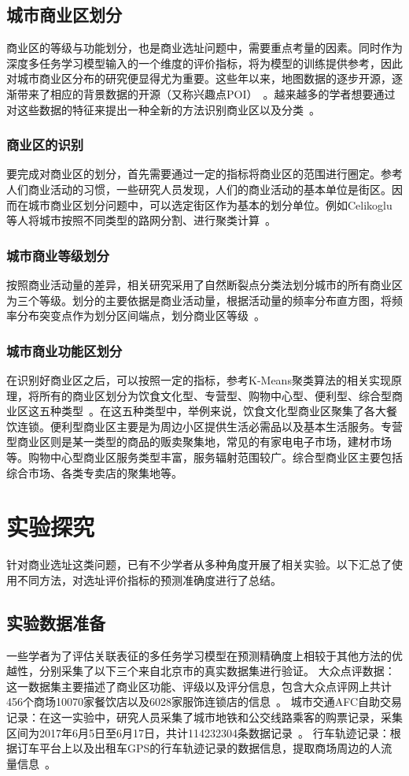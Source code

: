 \documentclass{llncs}
\begin{document}
\subsection{城市商业区划分}
商业区的等级与功能划分，也是商业选址问题中，需要重点考量的因素。同时作为深度多任务学习模型输入的一个维度的评价指标，将为模型的训练提供参考，因此对城市商业区分布的研究便显得尤为重要。这些年以来，地图数据的逐步开源，逐渐带来了相应的背景数据的开源（又称兴趣点POI）~\cite{feng2015personalized,yin2016adapting}。越来越多的学者想要通过对这些数据的特征来提出一种全新的方法识别商业区以及分类~\cite{wang2015shangyefenji}。
\subsubsection{商业区的识别}
要完成对商业区的划分，首先需要通过一定的指标将商业区的范围进行圈定。参考人们商业活动的习惯，一些研究人员发现，人们的商业活动的基本单位是街区。因而在城市商业区划分问题中，可以选定街区作为基本的划分单位。例如Celikoglu等人将城市按照不同类型的路网分割、进行聚类计算~\cite{celikoglu2016extension}。
\subsubsection{城市商业等级划分}
按照商业活动量的差异，相关研究采用了自然断裂点分类法划分城市的所有商业区为三个等级。划分的主要依据是商业活动量，根据活动量的频率分布直方图，将频率分布突变点作为划分区间端点，划分商业区等级~\cite{li2018ziranduanlie}。
\subsubsection{城市商业功能区划分}
在识别好商业区之后，可以按照一定的指标，参考K-Means聚类算法的相关实现原理，将所有的商业区划分为饮食文化型、专营型、购物中心型、便利型、综合型商业区这五种类型~\cite{frandsen2015automatic}。在这五种类型中，举例来说，饮食文化型商业区聚集了各大餐饮连锁。便利型商业区主要是为周边小区提供生活必需品以及基本生活服务。专营型商业区则是某一类型的商品的贩卖聚集地，常见的有家电电子市场，建材市场等。购物中心型商业区服务类型丰富，服务辐射范围较广。综合型商业区主要包括综合市场、各类专卖店的聚集地等。

\section{实验探究}
针对商业选址这类问题，已有不少学者从多种角度开展了相关实验。以下汇总了使用不同方法，对选址评价指标的预测准确度进行了总结。
\subsection{实验数据准备}
一些学者为了评估关联表征的多任务学习模型在预测精确度上相较于其他方法的优越性，分别采集了以下三个来自北京市的真实数据集进行验证。
大众点评数据：这一数据集主要描述了商业区功能、评级以及评分信息，包含大众点评网上共计456个商场10070家餐饮店以及6028家服饰连锁店的信息~\cite{xia2018dazhongdianping}。
城市交通AFC自助交易记录：在这一实验中，研究人员采集了城市地铁和公交线路乘客的购票记录，采集区间为2017年6月5日至6月17日，共计114232304条数据记录~\cite{huang2018beijingtraffic}。
行车轨迹记录：根据订车平台上以及出租车GPS的行车轨迹记录的数据信息，提取商场周边的人流量信息~\cite{cai2017didi}。
\end{document}
